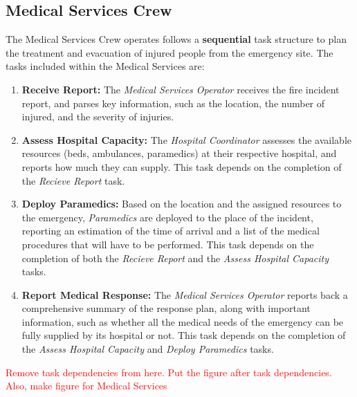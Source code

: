 \subsection{Medical Services Crew}

The Medical Services Crew operates follows a \textbf{sequential} task structure to plan the treatment and evacuation of injured people from the emergency site. The tasks included within the Medical Services are:

\begin{enumerate}
	\item \textbf{Receive Report:} The \textit{Medical Services Operator} receives the fire incident report, and parses key information, such as the location, the number of injured, and the severity of injuries.

	\item \textbf{Assess Hospital Capacity:} The \textit{Hospital Coordinator} assesses the available resources (beds, ambulances, paramedics) at their respective hospital, and reports how much they can supply. This task depends on the completion of the \textit{Recieve Report} task.
	
	\item \textbf{Deploy Paramedics:} Based on the location and the assigned resources to the emergency, \textit{Paramedics} are deployed to the place of the incident, reporting an estimation of the time of arrival and a list of the medical procedures that will have to be performed. This task depends on the completion of both the \textit{Recieve Report} and the \textit{Assess Hospital Capacity} tasks.
	
	\item \textbf{Report Medical Response:} The \textit{Medical Services Operator} reports back a comprehensive summary of the response plan, along with important information, such as whether all the medical needs of the emergency can be fully supplied by its hospital or not. This task depends on the completion of the \textit{Assess Hospital Capacity} and \textit{Deploy Paramedics} tasks.
\end{enumerate}

\textcolor{red}{Remove task dependencies from here. Put the figure after task dependencies. Also, make figure for Medical Services}

